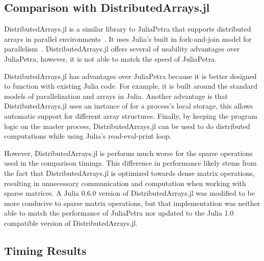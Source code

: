 \documentclass[acmsmall]{acmart}
\newcommand{\snippet}[1]{\texttt{\detokenize{#1}}}
\begin{document}
	\subsection{Comparison with DistributedArrays.jl}
	
	DistributedArrays.jl is a similar library to JuliaPetra that supports
	distributed arrays in parallel environments~\cite{Github:DA}.
	It uses Julia's built in fork-and-join model for parallelism~\cite{Bezanson:2017:FreshApproach}.
	DistributedArrays.jl offers several of usability advantages over JuliaPetra, however, it is not able to match the speed of JuliaPetra.
	
	DistributedArrays.jl has advantages over JuliaPetra because it is better designed to function with
	existing Julia code.
	For example, it is built around the standard models of parallelization and arrays in Julia.
	Another advantage is that DistributedArrays.jl uses an instance of \snippet{AbstractArray}
	for a process's local storage, this allows automatic support for different array structures.
	Finally, by keeping the program logic on the master process, DistributedArrays.jl can be used to
	do distributed computations while using Julia's read-eval-print loop.
	
	However, DistributedArrays.jl is performs much worse for the sparse operations used in the comparison timings.
	This difference in performance likely stems from the fact that DistributedArrays.jl is optimized towards dense matrix operations, resulting in unnecessary communication and computation when working with sparse matrices.
	A Julia 0.6.0 version of DistributedArrays.jl was modified to be more conducive to sparse matrix operations, but that implementation was neither able to match the performance of JuliaPetra nor updated to the Julia 1.0 compatible version of DistributedArrays.jl.
	
	\subsection{Timing Results}
	
\end{document}
